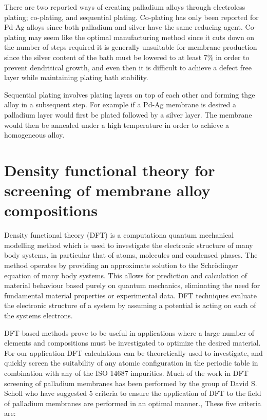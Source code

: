 There are two reported ways of creating palladium alloys through electroless plating; co-plating, and sequential plating. Co-plating has only been reported for Pd-Ag alloys since both palladium and silver have the same reducing agent.\cite{Kikuchi1991, UEMIYA1991303} Co-plating may seem like the optimal manufacturing method since it cuts down on the number of steps required it is generally unsuitable for membrane production since the silver content of the bath must be lowered to at least 7\% in order to prevent dendritical growth, and even then it is difficult to achieve a defect free layer while maintaining plating bath stability. \cite{Exter2015}

Sequential plating involves plating layers on top of each other and forming thge alloy in a subsequent step. For example if a Pd-Ag membrane is desired a palladium layer would first be plated followed by a silver layer. \cite{Exter2015} The membrane would then be annealed under a high temperature in order to achieve a homogeneous alloy. 

\section{Density functional theory for screening of membrane alloy compositions}

Density functional theory (DFT) is a computationa quantum mechanical modelling method which is used to investigate the electronic structure of many body systems, in particular that of atoms, molecules and condensed phases. The method operates by providing an approximate solution to the Schrödinger equation of many body systems. This allows for prediction and calculation of material behaviour based purely on quantum mechanics, eliminating the need for fundamental material properties or experimental data. DFT techniques evaluate the electronic structure of a system by assuming a potential is acting on each of the systems electrons. 

DFT-based methods prove to be useful in applications where a large number of elements and compositions must be investigated to optimize the desired material. For our application DFT calculations can be theoretically used to investigate, and quickly screen the suitability of any atomic configuration in the periodic table in combination with any of the ISO 14687 impurities. Much of the work in DFT screening of palladium membranes has been performed by the group of David S. Scholl who have suggested 5 criteria to ensure the application of DFT to the field of palladium membranes are performed in an optimal manner.\cite{SHOLL2007462}, \cite{doi:10.1021/ar500018b} These five criteria are:

